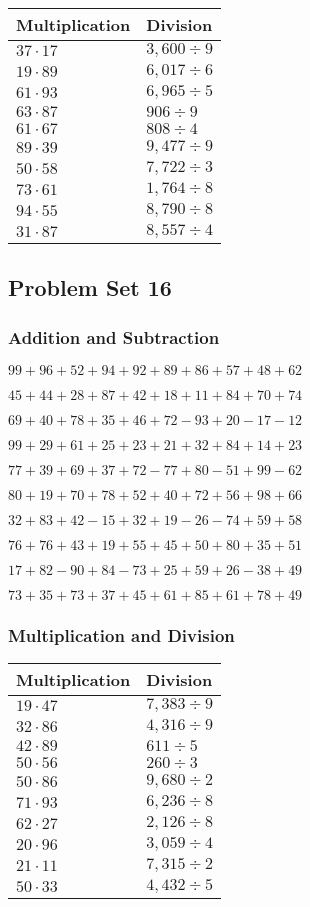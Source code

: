 \begin{longtable}[]{@{}ll@{}}
\toprule
Multiplication & Division\tabularnewline
\midrule
\endhead
\(37\cdot17\) & \(3,600÷9\)\tabularnewline
\(19\cdot89\) & \(6,017÷6\)\tabularnewline
\(61\cdot93\) & \(6,965÷5\)\tabularnewline
\(63\cdot87\) & \(906÷9\)\tabularnewline
\(61\cdot67\) & \(808÷4\)\tabularnewline
\(89\cdot39\) & \(9,477÷9\)\tabularnewline
\(50\cdot58\) & \(7,722÷3\)\tabularnewline
\(73\cdot61\) & \(1,764÷8\)\tabularnewline
\(94\cdot55\) & \(8,790÷8\)\tabularnewline
\(31\cdot87\) & \(8,557÷4\)\tabularnewline
\bottomrule
\end{longtable}

\hypertarget{problem-set-16-1}{%
\subsection{Problem Set 16}\label{problem-set-16-1}}

\hypertarget{addition-and-subtraction-56}{%
\subsubsection{Addition and
Subtraction}\label{addition-and-subtraction-56}}

\(99+96+52+94+92+89+86+57+48+ 62\)

\(45+44+28+87+42+18+11+84+70+74\)

\(69+40+78+35+46+72-93+20-17-12\)

\(99+29+61+25+23+21+32+84+14+23\)

\(77+39+69+37+72-77+80-51+99-62\)

\(80+19+70+78+52+40+72+56+98+66\)

\(32+83+42-15+32+19-26-74+59+58\)

\(76+76+43+19+55+45+50+80+35+51\)

\(17+82-90+84-73+25+59+26-38+49\)

\(73+35+73+37+45+61+85+61+78+49\)

\hypertarget{multiplication-and-division-56}{%
\subsubsection{Multiplication and
Division}\label{multiplication-and-division-56}}

\begin{longtable}[]{@{}ll@{}}
\toprule
Multiplication & Division\tabularnewline
\midrule
\endhead
\(19\cdot47\) & \(7,383÷9\)\tabularnewline
\(32\cdot86\) & \(4,316 ÷9\)\tabularnewline
\(42\cdot89\) & \(611÷5\)\tabularnewline
\(50\cdot56\) & \(260÷3\)\tabularnewline
\(50\cdot86\) & \(9,680÷2\)\tabularnewline
\(71\cdot93\) & \(6,236÷8\)\tabularnewline
\(62\cdot27\) & \(2,126÷8\)\tabularnewline
\(20\cdot96\) & \(3,059÷4\)\tabularnewline
\(21\cdot11\) & \(7,315÷2\)\tabularnewline
\(50\cdot33\) & \(4,432÷5\)\tabularnewline
\bottomrule
\end{longtable}

